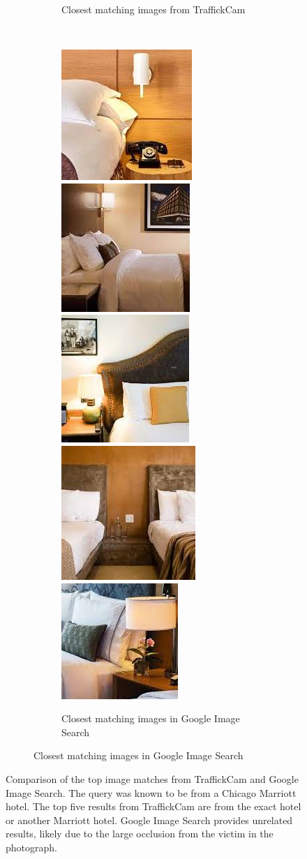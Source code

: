 \documentclass[12pt]{article}
\begin{document}
\begin{figure}
\begin{subfigure}[b]{4.5in}
\begin{subfigure}[b]{4.4in}
            \caption{Closest matching images from TraffickCam}
            \label{fig:tcamResults_tCam}
        \end{subfigure}\\
        \begin{subfigure}[b]{4.4in}
            \includegraphics[width=.85in]{figs/exampleSearch/google1}
            \includegraphics[width=.85in]{figs/exampleSearch/google2}
            \includegraphics[width=.85in]{figs/exampleSearch/google3}
            \includegraphics[width=.85in]{figs/exampleSearch/google4}
            \includegraphics[width=.85in]{figs/exampleSearch/google5}
            \caption{Closest matching images in Google Image Search}
            \label{fig:tcamResults_google}
        \end{subfigure}
     \end{subfigure}
    \caption[TraffickCam vs. Google Image Search]{Comparison of the top image matches from TraffickCam and Google Image Search. The query was known to be from a Chicago Marriott hotel. The top five results from TraffickCam are from the exact hotel or another Marriott hotel. Google Image Search provides unrelated results, likely due to the large occlusion from the victim in the photograph.}
    \label{fig:tcamResults}
\end{figure}
\end{document}
